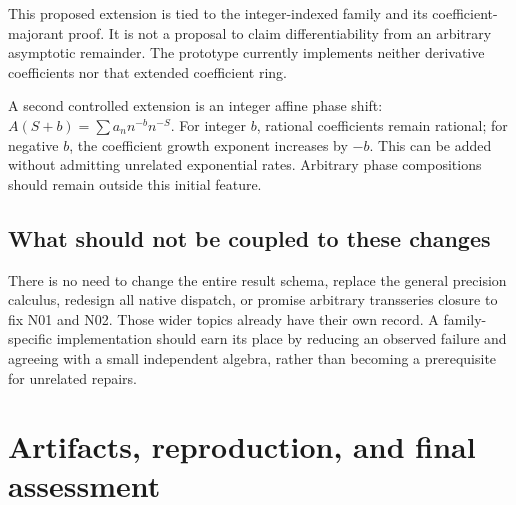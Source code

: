 \documentclass[11pt,letterpaper]{article}
\begin{document}
This proposed extension is tied to the integer-indexed family and its
coefficient-majorant proof. It is not a proposal to claim differentiability
from an arbitrary asymptotic remainder. The prototype currently implements
neither derivative coefficients nor that extended coefficient ring.

A second controlled extension is an integer affine phase shift:
$A(S+b)=\sum a_n n^{-b}n^{-S}$. For integer $b$, rational coefficients remain
rational; for negative $b$, the coefficient growth exponent increases by $-b$.
This can be added without admitting unrelated exponential rates. Arbitrary
phase compositions should remain outside this initial feature.

\subsection{What should not be coupled to these changes}
There is no need to change the entire result schema, replace the general
precision calculus, redesign all native dispatch, or promise arbitrary
transseries closure to fix N01 and N02. Those wider topics already have their
own record. A family-specific implementation should earn its place by reducing
an observed failure and agreeing with a small independent algebra, rather
than becoming a prerequisite for unrelated repairs.

\section{Artifacts, reproduction, and final assessment}
\end{document}
